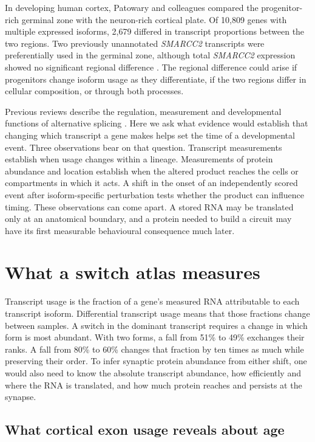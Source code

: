 \documentclass[11pt,a4paper]{article}
\begin{document}
In developing human cortex, Patowary and colleagues compared the progenitor-rich germinal zone with the neuron-rich cortical plate. Of 10,809 genes with multiple expressed isoforms, 2,679 differed in transcript proportions between the two regions. Two previously unannotated \textit{SMARCC2} transcripts were preferentially used in the germinal zone, although total \textit{SMARCC2} expression showed no significant regional difference \cite{Patowary2024}. The regional difference could arise if progenitors change isoform usage as they differentiate, if the two regions differ in cellular composition, or through both processes.

Previous reviews describe the regulation, measurement and developmental functions of alternative splicing \cite{Kalsotra2011,Choquet2025,Sousa2026}. Here we ask what evidence would establish that changing which transcript a gene makes helps set the time of a developmental event. Three observations bear on that question. Transcript measurements establish when usage changes within a lineage. Measurements of protein abundance and location establish when the altered product reaches the cells or compartments in which it acts. A shift in the onset of an independently scored event after isoform-specific perturbation tests whether the product can influence timing. These observations can come apart. A stored RNA may be translated only at an anatomical boundary, and a protein needed to build a circuit may have its first measurable behavioural consequence much later.

\section{What a switch atlas measures}

Transcript usage is the fraction of a gene's measured RNA attributable to each transcript isoform. Differential transcript usage means that those fractions change between samples. A switch in the dominant transcript requires a change in which form is most abundant. With two forms, a fall from 51\% to 49\% exchanges their ranks. A fall from 80\% to 60\% changes that fraction by ten times as much while preserving their order. To infer synaptic protein abundance from either shift, one would also need to know the absolute transcript abundance, how efficiently and where the RNA is translated, and how much protein reaches and persists at the synapse.

\subsection{What cortical exon usage reveals about age}
\end{document}
